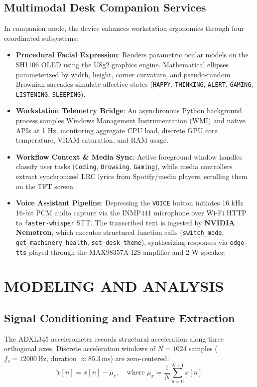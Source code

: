 \documentclass[10pt,journal,onecolumn]{IEEEtran}
\begin{document}
\subsection{Multimodal Desk Companion Services}
In companion mode, the device enhances workstation ergonomics through four coordinated subsystems:
\begin{itemize}
    \item \textbf{Procedural Facial Expression}: Renders parametric ocular models on the SH1106 OLED using the U8g2 graphics engine. Mathematical ellipses parameterized by width, height, corner curvature, and pseudo-random Brownian saccades simulate affective states (\texttt{HAPPY}, \texttt{THINKING}, \texttt{ALERT}, \texttt{GAMING}, \texttt{LISTENING}, \texttt{SLEEPING}).
    \item \textbf{Workstation Telemetry Bridge}: An asynchronous Python background process samples Windows Management Instrumentation (WMI) and native APIs at 1 Hz, monitoring aggregate CPU load, discrete GPU core temperature, VRAM saturation, and RAM usage.
    \item \textbf{Workflow Context \& Media Sync}: Active foreground window handles classify user tasks (\texttt{Coding}, \texttt{Browsing}, \texttt{Gaming}), while media controllers extract synchronized LRC lyrics from Spotify/media players, scrolling them on the TFT screen.
    \item \textbf{Voice Assistant Pipeline}: Depressing the \texttt{VOICE} button initiates 16 kHz 16-bit PCM audio capture via the INMP441 microphone over Wi-Fi HTTP to \texttt{faster-whisper} STT. The transcribed text is ingested by \textbf{NVIDIA Nemotron}, which executes structured function calls (\texttt{switch\_mode}, \texttt{get\_machinery\_health}, \texttt{set\_desk\_theme}), synthesizing responses via \texttt{edge-tts} played through the MAX98357A I2S amplifier and 2 W speaker.
\end{itemize}

\section{MODELING AND ANALYSIS}
\subsection{Signal Conditioning and Feature Extraction}
The ADXL345 accelerometer records structural acceleration along three orthogonal axes. Discrete acceleration windows of $N = 1024$ samples ($f_s = 12000\,\text{Hz}$, duration $\approx 85.3\,\text{ms}$) are zero-centered:
\begin{equation}
\tilde{x}[n] = x[n] - \mu_x, \quad \text{where } \mu_x = \frac{1}{N}\sum_{n=0}^{N-1}x[n]
\end{equation}
\end{document}
